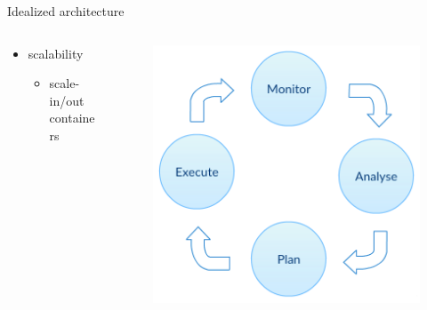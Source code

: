 \begin{frame}{Idealized architecture}
{\begin{columns}
\begin{column}{0.7\textwidth}
\begin{itemize}
					\item{\footnotesize{scalability}}
					\begin{itemize}
						\item{\scriptsize{scale-in/out containers}}
					\end{itemize}
				\end{itemize}
			\end{column}
			\begin{column}{0.3\textwidth}
				\begin{figure}
					\centering{}
					\includegraphics[scale=0.15]{images/autonomy.png}
				\end{figure}
			\end{column}
		\end{columns}
	}
\end{frame}

